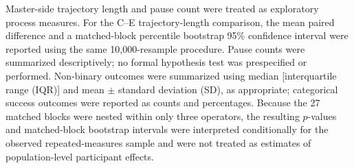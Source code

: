Master-side trajectory length and pause count were treated as exploratory process measures. For the C--E trajectory-length comparison, the mean paired difference and a matched-block percentile bootstrap 95\% confidence interval were reported using the same 10{,}000-resample procedure. Pause counts were summarized descriptively; no formal hypothesis test was prespecified or performed. Non-binary outcomes were summarized using median [interquartile range (IQR)] and mean $\pm$ standard deviation (SD), as appropriate; categorical success outcomes were reported as counts and percentages. Because the 27 matched blocks were nested within only three operators, the resulting $p$-values and matched-block bootstrap intervals were interpreted conditionally for the observed repeated-measures sample and were not treated as estimates of population-level participant effects.
